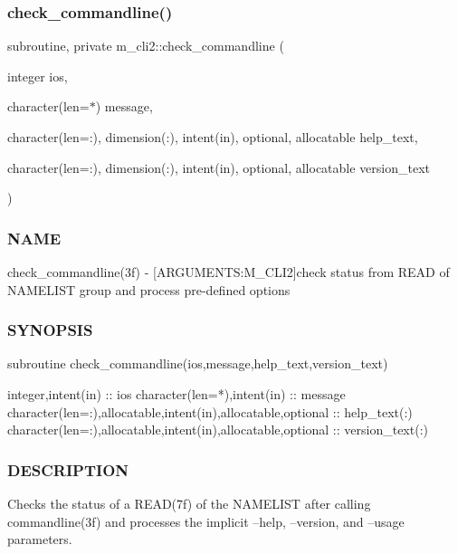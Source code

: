 \subsubsection{\texorpdfstring{check\+\_\+commandline()}{check\_commandline()}}
{\footnotesize\ttfamily subroutine, private m\+\_\+cli2\+::check\+\_\+commandline (\begin{DoxyParamCaption}\item[{integer}]{ios,  }\item[{character(len=$\ast$)}]{message,  }\item[{character(len=\+:), dimension(\+:), intent(in), optional, allocatable}]{help\+\_\+text,  }\item[{character(len=\+:), dimension(\+:), intent(in), optional, allocatable}]{version\+\_\+text }\end{DoxyParamCaption})\hspace{0.3cm}{\ttfamily [private]}}



\subsubsection*{N\+A\+ME}

check\+\_\+commandline(3f) -\/ \mbox{[}A\+R\+G\+U\+M\+E\+N\+TS\+:M\+\_\+\+C\+L\+I2\mbox{]}check status from R\+E\+AD of N\+A\+M\+E\+L\+I\+ST group and process pre-\/defined options 

\subsubsection*{S\+Y\+N\+O\+P\+S\+IS}

\begin{DoxyVerb}  subroutine check_commandline(ios,message,help_text,version_text)

   integer,intent(in) :: ios
   character(len=*),intent(in) :: message
   character(len=:),allocatable,intent(in),allocatable,optional :: help_text(:)
   character(len=:),allocatable,intent(in),allocatable,optional :: version_text(:)
\end{DoxyVerb}


\subsubsection*{D\+E\+S\+C\+R\+I\+P\+T\+I\+ON}

Checks the status of a R\+E\+A\+D(7f) of the N\+A\+M\+E\+L\+I\+ST after calling commandline(3f) and processes the implicit --help, --version, and --usage parameters.

